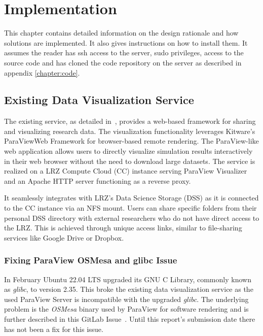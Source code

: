 \chapter{Implementation}\label{chapter:implementation}

This chapter contains detailed information on the design rationale and how
solutions are implemented. It also gives instructions on how to install them. It
assumes the reader has ssh access to the server, sudo privileges, access to the
source code and has cloned the code repository on the server as described in
appendix \ref{chapter:code}.

\section{Existing Data Visualization Service}

The existing service, as detailed in~\cite{nowak2024pvw}, provides a web-based
framework for sharing and visualizing research data. The visualization
functionality leverages Kitware's ParaViewWeb Framework for browser-based remote
rendering. The ParaView-like web application allows users to directly visualize
simulation results interactively in their web browser without the need to
download large datasets. The service is realized on a LRZ Compute Cloud (CC)
instance serving ParaView Visualizer and an Apache HTTP server functioning as a
reverse proxy.

It seamlessly integrates with LRZ's Data Science Storage (DSS) as it is
connected to the CC instance via an NFS mount. Users can share specific folders
from their personal DSS directory with external researchers who do not have
direct access to the LRZ. This is achieved through unique access links, similar
to file-sharing services like Google Drive or Dropbox.

\subsection{Fixing ParaView OSMesa and glibc Issue}

In February Ubuntu 22.04 LTS upgraded its GNU C Library, commonly known as
\textit{glibc}, to version 2.35. This broke the existing data visualization
service as the used ParaView Server is incompatible with the upgraded
\textit{glibc}. The underlying problem is the \textit{OSMesa} binary used by
ParaView for software rendering and is further described in this GitLab
Issue~\cite{kitwareOsmesaBinary}. Until this report's submission date there has
not been a fix for this issue.

